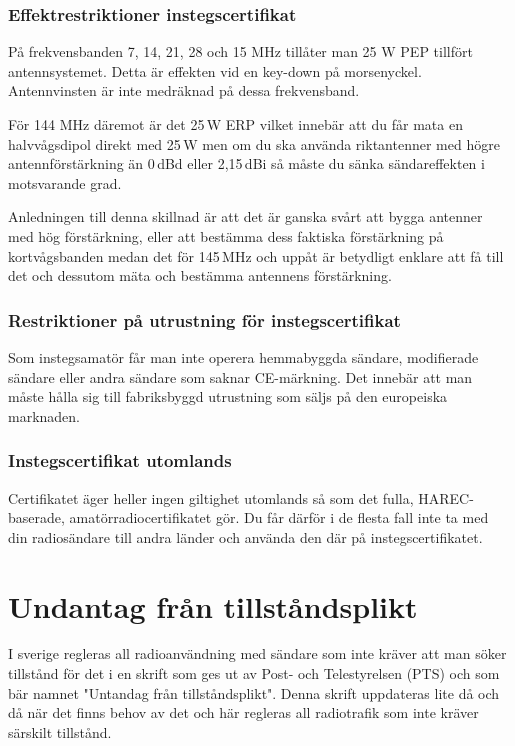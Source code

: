 \subsubsection{Effektrestriktioner instegscertifikat}

På frekvensbanden 7, 14, 21, 28 och 15 MHz tillåter man 25 W PEP
tillfört antennsystemet. Detta är effekten vid en key-down på
morsenyckel. Antennvinsten är inte medräknad på dessa frekvensband.

För 144 MHz däremot är det 25\,W ERP vilket innebär att du får mata en
halvvågsdipol direkt med 25\,W men om du ska använda riktantenner med
högre antennförstärkning än 0\,dBd eller 2,15\,dBi så måste du sänka
sändareffekten i motsvarande grad.

Anledningen till denna skillnad är att det är ganska svårt att bygga
antenner med hög förstärkning, eller att bestämma dess faktiska
förstärkning på kortvågsbanden medan det för 145\,MHz och uppåt är
betydligt enklare att få till det och dessutom mäta och bestämma
antennens förstärkning.

\subsubsection{Restriktioner på utrustning för instegscertifikat}

Som instegsamatör får man inte operera hemmabyggda sändare, modifierade
sändare eller andra sändare som saknar CE-märkning. Det innebär att man måste
hålla sig till fabriksbyggd utrustning som säljs på den europeiska marknaden.

\subsubsection{Instegscertifikat utomlands}

Certifikatet äger heller ingen giltighet utomlands så som det fulla,
HAREC-baserade, amatörradiocertifikatet gör. Du får därför i de flesta fall
inte ta med din radiosändare till andra länder och använda den där på
instegscertifikatet.

\section{Undantag från tillståndsplikt}

I sverige regleras all radioanvändning med sändare som inte kräver att man söker
tillstånd för det i en skrift som ges ut av Post- och Telestyrelsen (PTS) och
som bär namnet "Untandag från tillståndsplikt". Denna skrift uppdateras lite då
och då när det finns behov av det och här regleras all radiotrafik som inte
kräver särskilt tillstånd.

